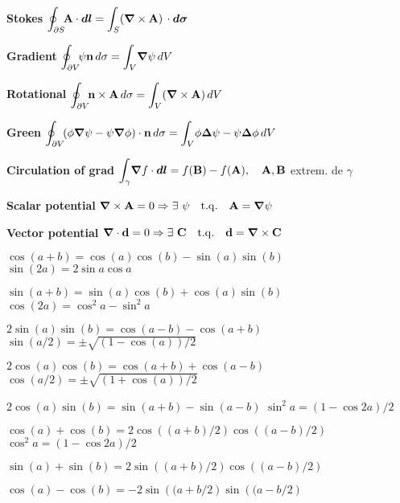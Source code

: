 \item \textbf{Stokes} \quad
$\displaystyle{\oint_{\partial S}} \! \vec{\rm{A}} \cdot \vec{dl} = \displaystyle{\int_S} (\vec{\nabla} \times \vec{\rm{A}}) \, \cdot \vec{d\sigma}$
 
\item \textbf{Gradient} \quad
$\displaystyle{\oint_{\partial V}} \! \psi\vec{\rm{n}} \, d\sigma = \displaystyle{\int_V} \vec{\nabla}\psi \, dV$
 
\item \textbf{Rotational} \quad
$\displaystyle{\oint_{\partial V}} \! \vec{\rm{n}} \times \vec{\rm{A}} \, d\sigma = \displaystyle{\int_V} (\vec{\nabla} \times \vec{\rm{A}}) \, dV$
 
\item \textbf{Green} \quad
$\displaystyle{\oint_{\partial V}} \! (\phi\vec{\nabla}\psi - \psi\vec{\nabla}\phi)\cdot\vec{\rm{n}} \, d\sigma = \displaystyle{\int_V} \phi\vec{\Delta}\psi - \psi\vec{\Delta}\phi \, dV$
 
\item \textbf{Circulation of grad} \quad
$\displaystyle{\int_{\gamma}} \vec{\nabla}f\cdot\vec{dl} = f(\vec{\rm B}) - f(\vec{\rm A}), \quad \vec{\rm{A}}, \vec{\rm{B}}$ extrem. de $\gamma$ 
 
\item \textbf{Scalar potential} \quad
$\vec{\nabla} \times \vec{\rm{A}} = 0 \Rightarrow \exists \ \psi \quad \mathrm{t.q.} \quad \vec{\rm{A}} = \vec{\nabla}\psi$
 
\item \textbf{Vector potential} \quad
$\vec{\nabla}\cdot\vec{\rm{d} } = 0 \Rightarrow \exists \ \vec{\rm{C}} \quad \mathrm{t.q.} \quad \vec{\rm{d} } = \vec{\nabla} \times \vec{\rm C}$
\squishend 

\squishlist 
\item $\cos(a+b) = \cos(a)\cos(b)-\sin(a)\sin(b)$ \squishsep $\sin(2a) = 2\sin a \cos a$
\item $\sin(a+b) = \sin(a)\cos(b) + \cos(a)\sin(b)$ \squishsep $\cos(2a) = \cos^2 a - \sin^2 a$
\item $2\sin(a)\sin(b) = \cos(a-b) - \cos(a+b)$ \smallsquishsep $\sin(a/2) = \pm \sqrt{(1-\cos(a))/2}$
\item $2\cos(a)\cos(b) = \cos(a+b) + \cos(a-b)$ \smallsquishsep $\cos(a/2) = \pm \sqrt{(1+\cos(a))/2}$
\item $2\cos(a)\sin(b) = \sin(a+b) - \sin(a-b)$ \smallsquishsep $\sin^2a = (1-\cos 2a)/2$
\item $\cos(a) + \cos(b) = 2\cos\left((a+b)/2\right)\cos\left((a-b)/2\right)$ \;\squishitem \; $\cos^2 a = (1-\cos 2a) / 2$
\item $\sin(a) + \sin(b) = 2\sin\left((a+b)/2\right)\cos\left((a-b)/2\right)$ 
\item $\cos(a) - \cos(b) = -2\sin\left((a+b/2\right)\sin\left((a-b/2\right)$ 

